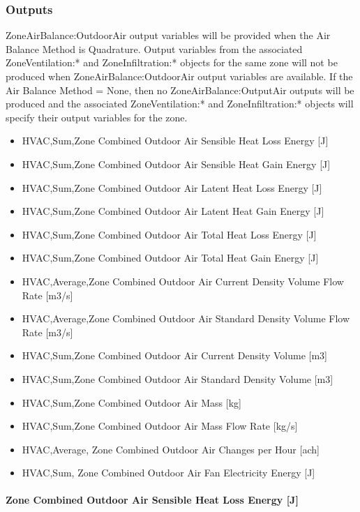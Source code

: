 \subsubsection{Outputs}\label{outputs-2-002}

ZoneAirBalance:OutdoorAir output variables will be provided when the Air Balance Method is Quadrature. Output variables from the associated ZoneVentilation:* and ZoneInfiltration:* objects for the same zone will not be produced when ZoneAirBalance:OutdoorAir output variables are available. If the Air Balance Method = None, then no ZoneAirBalance:OutputAir outputs will be produced and the associated ZoneVentilation:* and ZoneInfiltration:* objects will specify their output variables for the zone.

\begin{itemize}
\item
  HVAC,Sum,Zone Combined Outdoor Air Sensible Heat Loss Energy {[}J{]}
\item
  HVAC,Sum,Zone Combined Outdoor Air Sensible Heat Gain Energy {[}J{]}
\item
  HVAC,Sum,Zone Combined Outdoor Air Latent Heat Loss Energy {[}J{]}
\item
  HVAC,Sum,Zone Combined Outdoor Air Latent Heat Gain Energy {[}J{]}
\item
  HVAC,Sum,Zone Combined Outdoor Air Total Heat Loss Energy {[}J{]}
\item
  HVAC,Sum,Zone Combined Outdoor Air Total Heat Gain Energy {[}J{]}
\item
  HVAC,Average,Zone Combined Outdoor Air Current Density Volume Flow Rate {[}m3/s{]}
\item
  HVAC,Average,Zone Combined Outdoor Air Standard Density Volume Flow Rate {[}m3/s{]}
\item
  HVAC,Sum,Zone Combined Outdoor Air Current Density Volume {[}m3{]}
\item
  HVAC,Sum,Zone Combined Outdoor Air Standard Density Volume {[}m3{]}
\item
  HVAC,Sum,Zone Combined Outdoor Air Mass {[}kg{]}
\item
  HVAC,Sum,Zone Combined Outdoor Air Mass Flow Rate {[}kg/s{]}
\item
  HVAC,Average, Zone Combined Outdoor Air Changes per Hour {[}ach{]}
\item
  HVAC,Sum, Zone Combined Outdoor Air Fan Electricity Energy {[}J{]}
\end{itemize}

\paragraph{Zone Combined Outdoor Air Sensible Heat Loss Energy {[}J{]}}\label{zone-combined-outdoor-air-sensible-heat-loss-energy-j}

